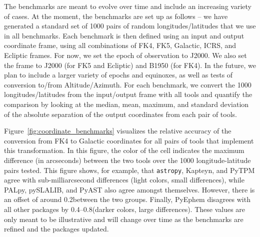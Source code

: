 \documentclass[modern]{aastex61}
\newcommand{\package}[1]{\texttt{#1}\xspace}
\newcommand{\astropypkg}{\package{astropy}}
\renewcommand{\figurename}{Figure\xspace}
\begin{document}
The benchmarks are meant to evolve over time and include an increasing variety
of cases. At the moment, the benchmarks are set up as follows --
we have generated a standard set of 1000 pairs of random longitudes/latitudes
that we use in all benchmarks. Each benchmark is then defined using an input
and output coordinate frame, using all combinations of FK4, FK5, Galactic,
ICRS, and Ecliptic frames. For now, we set the epoch of observation to J2000.
We also set the frame to J2000 (for FK5 and Ecliptic) and B1950 (for FK4).
In the future, we plan to include a larger variety of epochs and equinoxes,
as well as tests of conversion to/from Altitude/Azimuth. For each benchmark,
we convert the 1000 longitudes/latitudes from the input/output frame with all
tools and quantify the comparison by looking at the median, mean, maximum,
and standard deviation of the absolute separation of the output coordinates
from each pair of tools.

\figurename~\ref{fig:coordinate_benchmarks} visualizes the relative accuracy of
the conversion from FK4 to Galactic coordinates for all pairs of tools that
implement this transformation.
In this figure, the color of the cell indicates the maximum difference (in
arcseconds) between the two tools over the 1000 longitude-latitude pairs tested.
This figure shows, for example, that \astropypkg, Kapteyn, and PyTPM agree with
sub-milliarcsecond differences (light colors, small differences), while PALpy,
pySLALIB, and PyAST also agree amongst themselves.
However, there is an offset of around 0.2\arcsec\space between the two groups.
Finally, PyEphem disagrees with all other packages by 0.4--0.8\arcsec (darker
colors, large differences).
These values are only meant to be illustrative and will change over time as the
benchmarks are refined and the packages updated.
\end{document}
